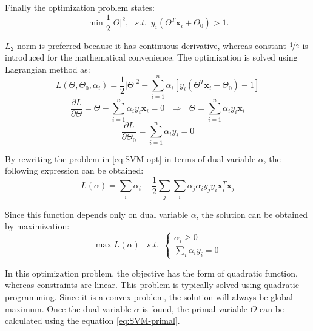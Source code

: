 \begin{appendix}
Finally the optimization problem states:
\begin{equation} 
\min \frac{1}{2} \vert \Theta \vert ^2, \,\,\,\, s.t. \,\,\, y_i \left(\Theta^T \mathbf{x}_i + \Theta_0\right) > 1.
\end{equation}

\noindent $L_2$ norm is preferred because it has continuous derivative, whereas constant $\nicefrac{1}{2}$ is introduced for the mathematical convenience. The optimization is solved using Lagrangian method as:
\begin{equation} \label{eq:SVM-opt}
L(\Theta, \Theta_0, \alpha_i) = \frac{1}{2} \vert \Theta \vert ^2 - \sum_{i=1}^n \alpha_i \left[y_i \left(\Theta^T \mathbf{x}_i + \Theta_0\right) - 1\right]
\end{equation}
\begin{equation} \label{eq:SVM-primal}
\frac{\partial L}{\partial \Theta} = \Theta - \sum_{i=1}^n \alpha_i y_i \mathbf{x}_i = 0 \,\,\,\, \Rightarrow \,\,\,\, \Theta = \sum_{i=1}^n \alpha_i y_i \mathbf{x}_i
\end{equation}
\begin{equation} \label{eq:SVM-dual}
\frac{\partial L}{\partial \Theta_0} = \sum_{i=1}^n \alpha_i y_i = 0
\end{equation}

By rewriting the problem in \ref{eq:SVM-opt} in terms of dual variable $\alpha$, the following expression can be obtained:
\begin{equation} \label{eq:SVM-rewritten}
L(\alpha) = \sum_i \alpha_i - \frac{1}{2} \sum_j \sum_i \alpha_j \alpha_i y_j y_i \mathbf{x}_i^T \mathbf{x}_j
\end{equation}

Since this function depends only on dual variable $\alpha$, the solution can be obtained by maximization:
\begin{equation} 
\max L(\alpha) \,\,\,\,\, s.t. \,\,\, \left\{\begin{array}{lr} \alpha_i \geq 0 \\
\sum_{i} \alpha_i y_i = 0  \end{array}\right.
\end{equation}

In this optimization problem, the objective has the form of quadratic function, whereas constraints are linear. This problem is typically solved using quadratic programming. Since it is a convex problem, the solution will always be global maximum. Once the dual variable $\alpha$ is found, the primal variable $\Theta$ can be calculated using the equation \ref{eq:SVM-primal}.


\end{appendix}

